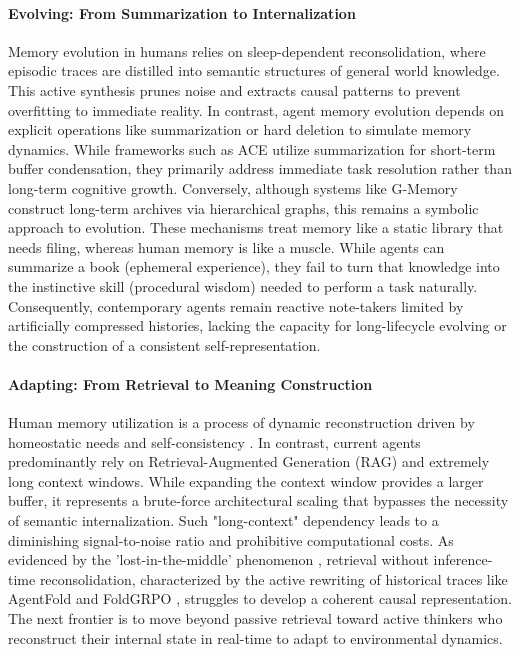 \documentclass[manuscript,screen]{acmart}
\begin{document}
\paragraph{Evolving: From Summarization to Internalization} Memory evolution in humans relies on sleep-dependent reconsolidation, where episodic traces are distilled into semantic structures of general world knowledge. This active synthesis prunes noise and extracts causal patterns to prevent overfitting to immediate reality. In contrast, agent memory evolution depends on explicit operations like summarization or hard deletion to simulate memory dynamics. While frameworks such as ACE \citep{zhang2025agentic} utilize summarization for short-term buffer condensation, they primarily address immediate task resolution rather than long-term cognitive growth. Conversely, although systems like G-Memory \citep{zhang2025gmemory} construct long-term archives via hierarchical graphs, this remains a symbolic approach to evolution. These mechanisms treat memory like a static library that needs filing, whereas human memory is like a muscle. While agents can summarize a book (ephemeral experience), they fail to turn that knowledge into the instinctive skill (procedural wisdom) needed to perform a task naturally. Consequently, contemporary agents remain reactive note-takers limited by artificially compressed histories, lacking the capacity for long-lifecycle evolving or the construction of a consistent self-representation.

\paragraph{Adapting: From Retrieval to Meaning Construction}
Human memory utilization is a process of dynamic reconstruction driven by homeostatic needs and self-consistency \citep{baddeley1988cognitive}. In contrast, current agents predominantly rely on Retrieval-Augmented Generation (RAG) and extremely long context windows. While expanding the context window provides a larger buffer, it represents a brute-force architectural scaling that bypasses the necessity of semantic internalization. Such "long-context" dependency leads to a diminishing signal-to-noise ratio and prohibitive computational costs. As evidenced by the 'lost-in-the-middle' phenomenon \citep{liu2024lost}, retrieval without inference-time reconsolidation, characterized by the active rewriting of historical traces like AgentFold \citep{ye2025agentfoldlonghorizonwebagents} and FoldGRPO \citep{sun2025scalinglonghorizonllmagent}, struggles to develop a coherent causal representation. The next frontier is to move beyond passive retrieval toward active thinkers who reconstruct their internal state in real-time to adapt to environmental dynamics.
\end{document}

